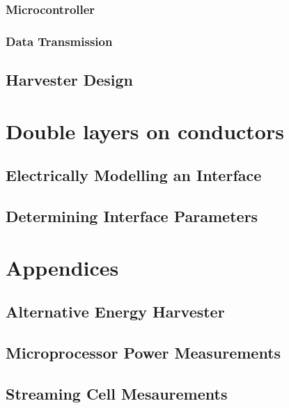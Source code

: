         \section{Microcontroller}
            
        \section{Data Transmission}
            
    \chapter{Harvester Design}
        

\part{\label{part:doubleLayersOnConductors}Double layers on conductors}
    \chapter{Electrically Modelling an Interface}
        
    \chapter{Determining Interface Parameters}
        

\part{Appendices}
    \appendix
    \chapter{Alternative Energy Harvester}
        
    \chapter{Microprocessor Power Measurements}
        
    \chapter{Streaming Cell Mesaurements}
        







